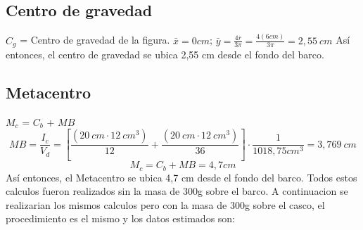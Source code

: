 \documentclass[letterpaper]{article}
\begin{document}
\subsection{Centro de gravedad}
$C_{g}$ = Centro de gravedad de la figura.
\newline
$\bar{x}=0 cm$;
\newline 
$\bar{y}= \frac{4r}{3\pi} = \frac{4(6cm)}{3\pi} = 2,55~cm$
Así entonces, el centro de gravedad se ubica 2,55 cm desde el fondo del barco.
\subsection{Metacentro}
$M_{c}$ = $C_{b}$ + $MB$
\newline
\begin{equation}
	MB=\frac{I_{c}}{V_{d}} = [\frac{(20~cm \cdot 12~cm^3)}{12} + \frac{(20~cm \cdot 12~cm^3)}{36}] \cdot \frac{1}{1018,75cm^3} = 3,769~cm
\end{equation}
\begin{equation}
	M_{c} = C_{b} + MB = 4,7cm
\end{equation}
\newline
Así entonces, el Metacentro se ubica 4,7 cm desde el fondo del barco.
\newline
Todos estos calculos fueron realizados sin la masa de 300g sobre el barco.
A continuacion se realizarian los mismos calculos pero con la masa de 300g sobre el casco, el procedimiento es el mismo y los datos estimados son:
\newline
\end{document}
